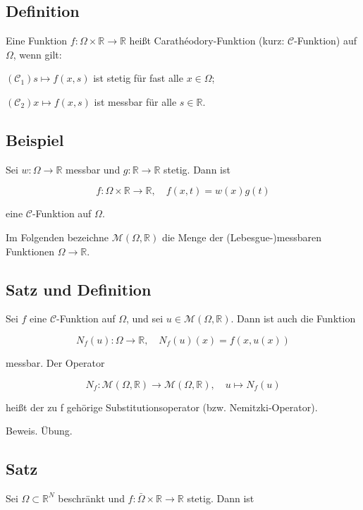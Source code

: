\documentclass[10pt, letterpaper]{article}
\begin{document}
\subsection*{Definition}

Eine Funktion $f: \Omega \times \mathbb{R} \rightarrow \mathbb{R}$ heißt Carathéodory-Funktion (kurz: $\mathcal{C}$-Funktion) auf $\Omega$, wenn gilt:

$\left(\mathcal{C}_{1}\right) s \mapsto f(x, s)$ ist stetig für fast alle $x \in \Omega$;

$\left(\mathcal{C}_{2}\right) x \mapsto f(x, s)$ ist messbar für alle $s \in \mathbb{R}$.

\subsection*{Beispiel}

Sei $w: \Omega \rightarrow \mathbb{R}$ messbar und $g: \mathbb{R} \rightarrow \mathbb{R}$ stetig. Dann ist

$$
f: \Omega \times \mathbb{R} \rightarrow \mathbb{R}, \quad f(x, t)=w(x) g(t)
$$

eine $\mathcal{C}$-Funktion auf $\Omega$.

Im Folgenden bezeichne $\mathcal{M}(\Omega, \mathbb{R})$ die Menge der (Lebesgue-)messbaren Funktionen $\Omega \rightarrow \mathbb{R}$.

\subsection*{Satz und Definition}

Sei $f$ eine $\mathcal{C}$-Funktion auf $\Omega$, und sei $u \in \mathcal{M}(\Omega, \mathbb{R})$. Dann ist auch die Funktion

$$
N_{f}(u): \Omega \rightarrow \mathbb{R}, \quad N_{f}(u)(x)=f(x, u(x))
$$

messbar. Der Operator

$$
N_{f}: \mathcal{M}(\Omega, \mathbb{R}) \rightarrow \mathcal{M}(\Omega, \mathbb{R}), \quad u \mapsto N_{f}(u)
$$

heißt der zu f gehörige Substitutionsoperator (bzw. Nemitzki-Operator).

Beweis. Übung.

\subsection*{Satz}

Sei $\Omega \subset \mathbb{R}^{N}$ beschränkt und $f: \bar{\Omega} \times \mathbb{R} \rightarrow \mathbb{R}$ stetig. Dann ist
\end{document}

